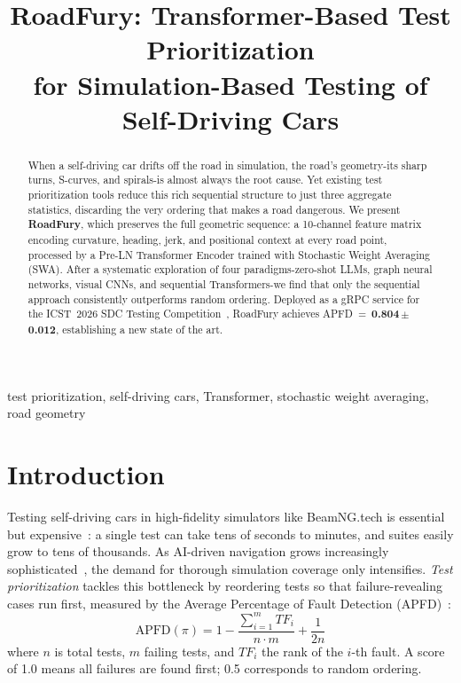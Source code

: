 ﻿\documentclass[conference]{IEEEtran}
\begin{document}
\title{RoadFury: Transformer-Based Test Prioritization\\for Simulation-Based Testing of Self-Driving Cars}
\author{
}
\maketitle

\begin{abstract}
When a self-driving car drifts off the road in simulation, the road's geometry-its sharp turns, S-curves, and spirals-is almost always the root cause. Yet existing test prioritization tools reduce this rich sequential structure to just three aggregate statistics, discarding the very ordering that makes a road dangerous. We present \textbf{RoadFury}, which preserves the full geometric sequence: a 10-channel feature matrix encoding curvature, heading, jerk, and positional context at every road point, processed by a Pre-LN Transformer Encoder trained with Stochastic Weight Averaging (SWA). After a systematic exploration of four paradigms-zero-shot LLMs, graph neural networks, visual CNNs, and sequential Transformers-we find that only the sequential approach consistently outperforms random ordering. Deployed as a gRPC service for the ICST~2026 SDC Testing Competition~\cite{b8}, RoadFury achieves APFD~=~\textbf{0.804\,$\pm$\,0.012}, establishing a new state of the art.
\end{abstract}

\begin{IEEEkeywords}
test prioritization, self-driving cars, Transformer, stochastic weight averaging, road geometry
\end{IEEEkeywords}

\section{Introduction}

Testing self-driving cars in high-fidelity simulators like BeamNG.tech is essential but expensive~\cite{b1,b2}: a single test can take tens of seconds to minutes, and suites easily grow to tens of thousands. As AI-driven navigation grows increasingly sophisticated~\cite{b16}, the demand for thorough simulation coverage only intensifies. \emph{Test prioritization} tackles this bottleneck by reordering tests so that failure-revealing cases run first, measured by the Average Percentage of Fault Detection (APFD)~\cite{b4}:
\vspace{-3pt}
\begin{equation}
\text{APFD}(\pi) = 1 - \frac{\sum_{i=1}^{m} TF_i}{n \cdot m} + \frac{1}{2n}
\end{equation}
where $n$ is total tests, $m$ failing tests, and $TF_i$ the rank of the $i$-th fault. A score of 1.0 means all failures are found first; 0.5 corresponds to random ordering.
\end{document}
